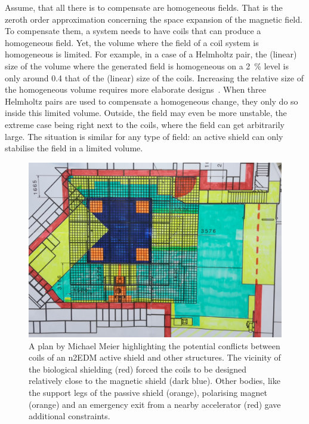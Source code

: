  Assume, that all there is to compensate are homogeneous fields.
 That is the zeroth order approximation concerning the space expansion of the magnetic field.
 To compensate them, a system needs to have coils that can produce a homogeneous field.
 Yet, the volume where the field of a coil system is homogeneous is limited.
 For example, in a case of a Helmholtz pair, the (linear) size of the volume where the generated field is homogeneous on a \SI{2}{\percent} level is only around \num{0.4} that of the (linear) size of the coils.
 Increasing the relative size of the homogeneous volume requires more elaborate designs~\cite{Kirschvink1992}.
 When three Helmholtz pairs are used to compensate a homogeneous change, they only do so inside this limited volume.
 Outside, the field may even be more unstable, the extreme case being right next to the coils, where the field can get arbitrarily large.
 The situation is similar for any type of field: an active shield can only stabilise the field in a limited volume.

\begin{figure}[tbh]
  \centering
  \includegraphics[width=\linewidth]{gfx/nEDM_SFC/n2EDM_SFC_situation.jpg}
  \caption{A plan by Michael Meier highlighting the potential conflicts between coils of an n2EDM active shield and other structures. The vicinity of the biological shielding (red) forced the coils to be designed relatively close to the magnetic shield (dark blue). Other bodies, like the support legs of the passive shield (orange), polarising magnet (orange) and an emergency exit from a nearby accelerator (red) gave additional constraints.}\label{fig:n2EDM_sfc_situational_plan}
\end{figure}

